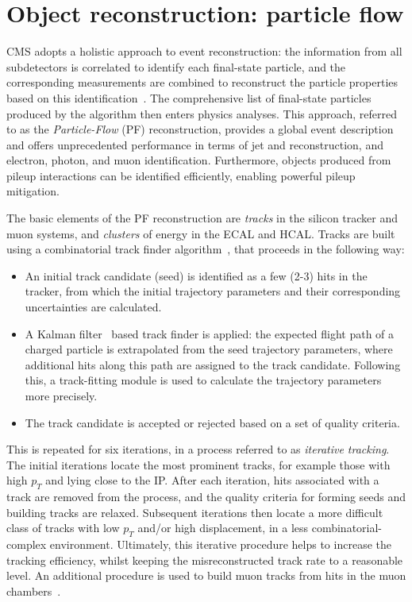\section{Object reconstruction: particle flow}\label{sec:particle_flow}
CMS adopts a holistic approach to event reconstruction: the information from all subdetectors is correlated to identify each final-state particle, and the corresponding measurements are combined to reconstruct the particle properties based on this identification~\cite{Sirunyan:2017ulk}. The comprehensive list of final-state particles produced by the algorithm then enters physics analyses. This approach, referred to as the \textit{Particle-Flow} (PF) reconstruction, provides a global event description and offers unprecedented performance in terms of jet and \met reconstruction, and electron, photon, and muon identification. Furthermore, objects produced from pileup interactions can be identified efficiently, enabling powerful pileup mitigation.

The basic elements of the PF reconstruction are \textit{tracks} in the silicon tracker and muon systems, and \textit{clusters} of energy in the ECAL and HCAL. Tracks are built using a combinatorial track finder algorithm~\cite{Chatrchyan:2014fea}, that proceeds in the following way:
\begin{itemize}
    \item An initial track candidate (seed) is identified as a few (2-3) hits in the tracker, from which the initial trajectory parameters and their corresponding uncertainties are calculated.
    \item A Kalman filter~\cite{BILLOIR1990219} based track finder is applied: the expected flight path of a charged particle is extrapolated from the seed trajectory parameters, where additional hits along this path are assigned to the track candidate. Following this, a track-fitting module is used to calculate the trajectory parameters more precisely.
    \item The track candidate is accepted or rejected based on a set of quality criteria.
\end{itemize}
\noindent
This is repeated for six iterations, in a process referred to as \textit{iterative tracking}. The initial iterations locate the most prominent tracks, for example those with high $p_T$ and lying close to the IP. After each iteration, hits associated with a track are removed from the process, and the quality criteria for forming seeds and building tracks are relaxed. Subsequent iterations then locate a more difficult class of tracks with low $p_T$ and/or high displacement, in a less combinatorial-complex environment. Ultimately, this iterative procedure helps to increase the tracking efficiency, whilst keeping the misreconstructed track rate to a reasonable level. An additional procedure is used to build muon tracks from hits in the muon chambers~\cite{Chatrchyan:2012xi}.

